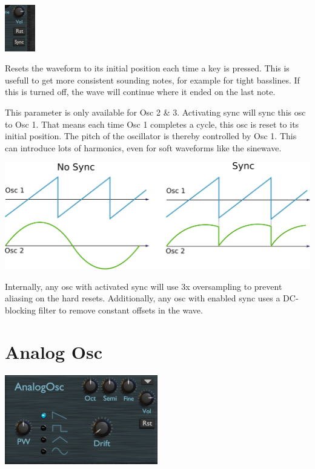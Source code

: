 \begin{center}
    \includegraphics[width=0.1\textwidth]{graphics/osc_common2.png}
\end{center}

{Resets the waveform to its initial position each time a key is pressed. This is usefull to get more consistent sounding notes, for example for tight basslines. If this is turned off, the wave will continue where it ended on the last note.}

{This parameter is only available for Osc 2 \& 3. Activating sync will sync this osc to Osc 1. That means each time Osc 1 completes a cycle, this osc is reset to its initial position. The pitch of the oscillator is thereby controlled by Osc 1. This can introduce lots of harmonics, even for soft waveforms like the sinewave.

\vspace{5mm}

\includegraphics[width=\textwidth]{graphics/osc_sync.png}

Internally, any osc with activated sync will use 3x oversampling to prevent aliasing on the hard resets. Additionally, any osc with enabled sync uses a DC-blocking filter to remove constant offsets in the wave.}

\section{Analog Osc}

\begin{center}
    \includegraphics[width=0.5\textwidth]{graphics/analog_osc.png}
\end{center}

